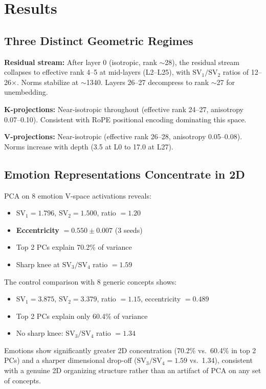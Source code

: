 \documentclass[11pt,a4paper]{article}
\begin{document}
\section{Results}

\subsection{Three Distinct Geometric Regimes}

\textbf{Residual stream:} After layer 0 (isotropic, rank $\sim$28), the residual stream collapses to effective rank 4--5 at mid-layers (L2--L25), with $\text{SV}_1/\text{SV}_2$ ratios of 12--26$\times$. Norms stabilize at $\sim$1340. Layers 26--27 decompress to rank $\sim$27 for unembedding.

\textbf{K-projections:} Near-isotropic throughout (effective rank 24--27, anisotropy 0.07--0.10). Consistent with RoPE positional encoding dominating this space.

\textbf{V-projections:} Near-isotropic (effective rank 26--28, anisotropy 0.05--0.08). Norms increase with depth (3.5 at L0 to 17.0 at L27).

\subsection{Emotion Representations Concentrate in 2D}

PCA on 8 emotion V-space activations reveals:
\begin{itemize}
    \item $\text{SV}_1 = 1.796$, $\text{SV}_2 = 1.500$, ratio $= 1.20$
    \item \textbf{Eccentricity} $= 0.550 \pm 0.007$ (3 seeds)
    \item Top 2 PCs explain 70.2\% of variance
    \item Sharp knee at $\text{SV}_3/\text{SV}_4$ ratio $= 1.59$
\end{itemize}

The control comparison with 8 generic concepts shows:
\begin{itemize}
    \item $\text{SV}_1 = 3.875$, $\text{SV}_2 = 3.379$, ratio $= 1.15$, eccentricity $= 0.489$
    \item Top 2 PCs explain only 60.4\% of variance
    \item No sharp knee: $\text{SV}_3/\text{SV}_4$ ratio $= 1.34$
\end{itemize}

Emotions show significantly greater 2D concentration (70.2\% vs.\ 60.4\% in top 2 PCs) and a sharper dimensional drop-off ($\text{SV}_3/\text{SV}_4 = 1.59$ vs.\ 1.34), consistent with a genuine 2D organizing structure rather than an artifact of PCA on any set of concepts.
\end{document}
